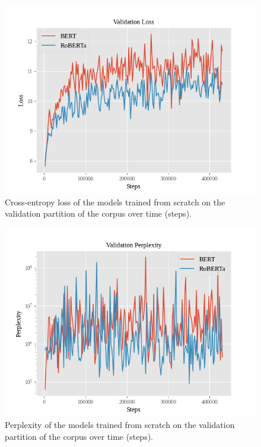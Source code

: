 \documentclass[12pt]{article}
\begin{document}
\begin{figure}[!t]
    \includegraphics[width=\linewidth]{figures/scratch_validation_loss.png}
    \caption{Cross-entropy loss of the models trained from scratch on the validation partition of the corpus over time (steps).}
    \label{fig:scratch_validation_loss}
\end{figure}

\begin{figure}[!t]
    \includegraphics[width=\linewidth]{figures/scratch_validation_ppl.png}
    \caption{Perplexity of the models trained from scratch on the validation partition of the corpus over time (steps).}
    \label{fig:scratch_validation_ppl}
\end{figure}
\end{document}
